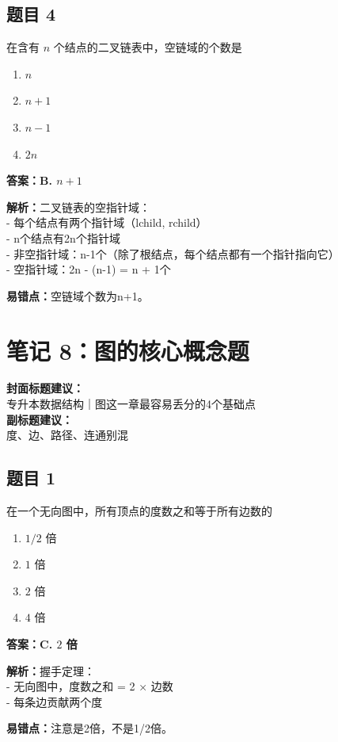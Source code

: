 \documentclass[12pt,a4paper]{ctexart}
\begin{document}
\subsection*{题目 4}
在含有 $n$ 个结点的二叉链表中，空链域的个数是
\begin{enumerate}[label=\Alph*.]
	\item $n$
	\item $n+1$
	\item $n-1$
	\item $2n$
\end{enumerate}

\begin{answerbox}
	\textbf{答案：B. $n+1$}

	\textbf{解析：}二叉链表的空指针域：\\
	- 每个结点有两个指针域（lchild, rchild）\\
	- n个结点有2n个指针域\\
	- 非空指针域：n-1个（除了根结点，每个结点都有一个指针指向它）\\
	- 空指针域：2n - (n-1) = n + 1个

	\textbf{易错点：}空链域个数为n+1。
\end{answerbox}

\newpage

\section{笔记 8：图的核心概念题}
\begin{coverbox}
	\textbf{封面标题建议：}\\
	专升本数据结构｜图这一章最容易丢分的4个基础点\\
	\textbf{副标题建议：}\\
	度、边、路径、连通别混
\end{coverbox}

\subsection*{题目 1}
在一个无向图中，所有顶点的度数之和等于所有边数的
\begin{enumerate}[label=\Alph*.]
	\item $1/2$ 倍
	\item $1$ 倍
	\item $2$ 倍
	\item $4$ 倍
\end{enumerate}

\begin{answerbox}
	\textbf{答案：C. $2$ 倍}

	\textbf{解析：}握手定理：\\
	- 无向图中，度数之和 = 2 × 边数\\
	- 每条边贡献两个度

	\textbf{易错点：}注意是2倍，不是1/2倍。
\end{answerbox}
\end{document}
